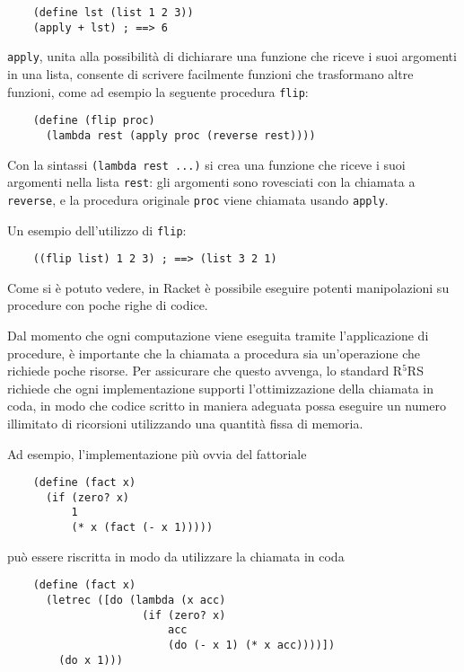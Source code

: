 \begin{lstlisting}
    (define lst (list 1 2 3))
    (apply + lst) ; ==> 6
\end{lstlisting}

\lstinline{apply}, unita alla possibilit\`a di dichiarare una funzione
che riceve i suoi argomenti in una lista, consente di scrivere
facilmente funzioni che trasformano altre funzioni, come ad esempio la
seguente procedura \lstinline{flip}:

\begin{lstlisting}
    (define (flip proc)
      (lambda rest (apply proc (reverse rest))))
\end{lstlisting}

Con la sintassi \lstinline{(lambda rest ...)} si crea una funzione che
riceve i suoi argomenti nella lista \lstinline{rest}: gli argomenti
sono rovesciati con la chiamata a \lstinline{reverse}, e la procedura
originale \lstinline{proc} viene chiamata usando \lstinline{apply}.

Un esempio dell'utilizzo di \lstinline{flip}:

\begin{lstlisting}
    ((flip list) 1 2 3) ; ==> (list 3 2 1)
\end{lstlisting}

Come si \`e potuto vedere, in Racket \`e possibile eseguire potenti
manipolazioni su procedure con poche righe di codice.

Dal momento che ogni computazione viene eseguita tramite l'applicazione
di procedure, \`e importante che la chiamata a procedura sia
un'operazione che richiede poche risorse. Per assicurare che questo
avvenga, lo standard R$^{5}$RS richiede che ogni implementazione supporti
l'ottimizzazione della chiamata in coda, in modo che codice scritto
in maniera adeguata possa eseguire un numero illimitato di ricorsioni
utilizzando una quantit\`a fissa di memoria.

Ad esempio, l'implementazione pi\`u ovvia del fattoriale

\begin{lstlisting}
    (define (fact x)
      (if (zero? x)
          1
          (* x (fact (- x 1)))))
\end{lstlisting}

pu\`o essere riscritta in modo da utilizzare la chiamata in coda

\begin{lstlisting}
    (define (fact x)
      (letrec ([do (lambda (x acc)
                     (if (zero? x)
                         acc
                         (do (- x 1) (* x acc))))])
        (do x 1)))
\end{lstlisting}

